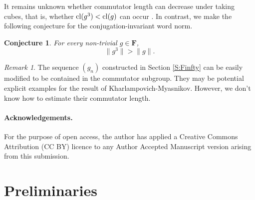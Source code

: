 \documentclass[12pt,reqno,a4paper]{article}
\newtheorem*{conjecture}{Conjecture}
\theoremstyle{definition}
\theoremstyle{remark}
\newtheorem{remark}[theorem]{Remark}
\numberwithin{equation}{section}
\numberwithin{figure}{section}
\newcommand{\B}[1]{{\mathbf #1}}
\newcommand{\AL}[1]{\textcolor{red}{#1}}
\begin{document}
It remains unknown whether commutator length can decrease under taking cubes, that is, whether ${\rm cl}(g^3)<{\rm cl}(g)$ can occur \cite[Section 3.3]{zbMATH07861316}. In contrast, we make the following conjecture for the conjugation-invariant word norm.
\begin{conjecture}
For every non-trivial $g\in \B F$,
\[
\|g^3\|>\|g\|.
\]
\end{conjecture}

\begin{remark}
The sequence $(g_n)$ constructed in Section \ref{S:Finfty} can be easily modified
to be contained in the commutator subgroup.
They may be potential explicit examples for the result of Kharlampovich-Myasnikov. 
However, we don't know how to estimate their commutator length.
\end{remark}





\paragraph{Acknowledgements.}
For the purpose of open access, the author has applied a Creative Commons
Attribution (CC BY) licence to any Author Accepted Manuscript version
arising from this submission.




\section{Preliminaries}\label{S:preliminaries}
\end{document}
